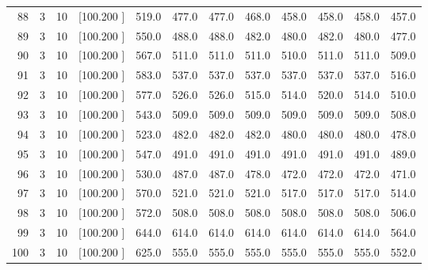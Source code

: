 \documentclass[12pt,a4paper]{article}
\begin{document}
\begin{center}
{\begin{tabular}{r r r r r r r r r r r r}
  88&  3& 10&[100.200   ]&   519.0&   477.0&   477.0&   468.0&   458.0&   458.0&   458.0&   457.0\\[-0.02in]
  89&  3& 10&[100.200   ]&   550.0&   488.0&   488.0&   482.0&   480.0&   482.0&   480.0&   477.0\\[-0.02in]
  90&  3& 10&[100.200   ]&   567.0&   511.0&   511.0&   511.0&   510.0&   511.0&   511.0&   509.0\\[-0.02in]
  91&  3& 10&[100.200   ]&   583.0&   537.0&   537.0&   537.0&   537.0&   537.0&   537.0&   516.0\\[-0.02in]
  92&  3& 10&[100.200   ]&   577.0&   526.0&   526.0&   515.0&   514.0&   520.0&   514.0&   510.0\\[-0.02in]
  93&  3& 10&[100.200   ]&   543.0&   509.0&   509.0&   509.0&   509.0&   509.0&   509.0&   508.0\\[-0.02in]
  94&  3& 10&[100.200   ]&   523.0&   482.0&   482.0&   482.0&   480.0&   480.0&   480.0&   478.0\\[-0.02in]
  95&  3& 10&[100.200   ]&   547.0&   491.0&   491.0&   491.0&   491.0&   491.0&   491.0&   489.0\\[-0.02in]
  96&  3& 10&[100.200   ]&   530.0&   487.0&   487.0&   478.0&   472.0&   472.0&   472.0&   471.0\\[-0.02in]
  97&  3& 10&[100.200   ]&   570.0&   521.0&   521.0&   521.0&   517.0&   517.0&   517.0&   514.0\\[-0.02in]
  98&  3& 10&[100.200   ]&   572.0&   508.0&   508.0&   508.0&   508.0&   508.0&   508.0&   506.0\\[-0.02in]
  99&  3& 10&[100.200   ]&   644.0&   614.0&   614.0&   614.0&   614.0&   614.0&   614.0&   564.0\\[-0.02in]
 100&  3& 10&[100.200   ]&   625.0&   555.0&   555.0&   555.0&   555.0&   555.0&   555.0&   552.0\\[-0.02in]

\hline
\end{tabular}}
\end{center}
\end{document}
